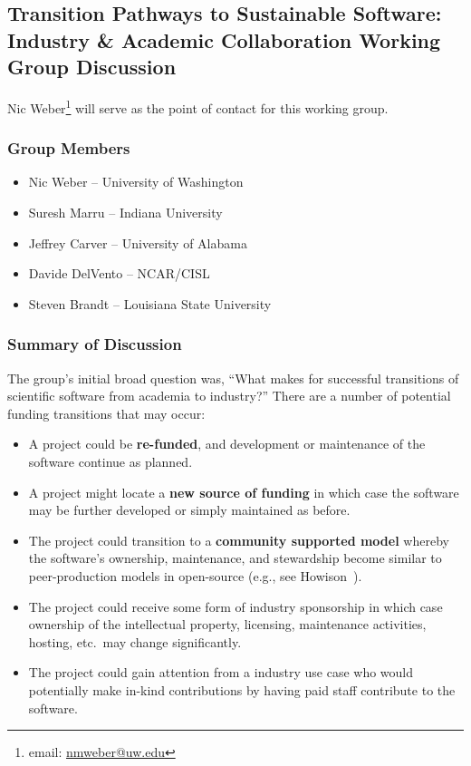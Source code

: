 \subsection{Transition Pathways to Sustainable Software: Industry \& Academic Collaboration Working Group Discussion}
\label{sec:appendix_industry_interaction}

Nic Weber\footnote{email: \href{mailto:nmweber@uw.edu}{nmweber@uw.edu}} will
serve as the point of contact for this working group.

\subsubsection{Group Members}

\begin{itemize}
\item Nic Weber -- University of Washington
\item Suresh Marru -- Indiana University
\item Jeffrey Carver -- University of Alabama
\item Davide DelVento -- NCAR/CISL
\item Steven Brandt -- Louisiana State University
\end{itemize} 

\subsubsection{Summary of Discussion}

The group's initial broad question was, ``What makes for successful transitions of
scientific software from academia to industry?'' There are a number of potential
funding transitions that may occur:
%
\begin{itemize}

\item A project could be \textbf{re-funded}, and development or maintenance of
the software continue as planned.

\item A project might locate a \textbf{new source of funding} in which case the
software may be further developed or simply maintained as before.

\item The project could transition to a \textbf{community supported model}
whereby the software's ownership, maintenance, and stewardship  become similar
to peer-production models in open-source (e.g., see
Howison~\cite{howison_sustaining_2015}).

\item The project could receive some form of industry sponsorship in which case
ownership of the intellectual property, licensing, maintenance activities,
hosting, etc.\ may change significantly.

\item The project could gain attention from a industry use case who would
potentially make in-kind contributions by having paid staff contribute to the
software.

\end{itemize}

